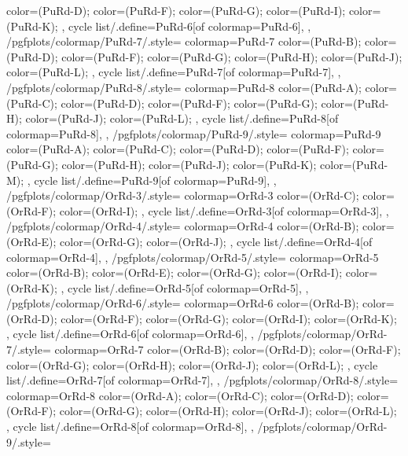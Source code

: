 {{{      color=(PuRd-D);
      color=(PuRd-F);
      color=(PuRd-G);
      color=(PuRd-I);
      color=(PuRd-K);
    },
    cycle list/.define={PuRd-6}{[of colormap=PuRd-6]},
  },
  /pgfplots/colormap/PuRd-7/.style={
    colormap={PuRd-7}{
      color=(PuRd-B);
      color=(PuRd-D);
      color=(PuRd-F);
      color=(PuRd-G);
      color=(PuRd-H);
      color=(PuRd-J);
      color=(PuRd-L);
    },
    cycle list/.define={PuRd-7}{[of colormap=PuRd-7]},
  },
  /pgfplots/colormap/PuRd-8/.style={
    colormap={PuRd-8}{
      color=(PuRd-A);
      color=(PuRd-C);
      color=(PuRd-D);
      color=(PuRd-F);
      color=(PuRd-G);
      color=(PuRd-H);
      color=(PuRd-J);
      color=(PuRd-L);
    },
    cycle list/.define={PuRd-8}{[of colormap=PuRd-8]},
  },
  /pgfplots/colormap/PuRd-9/.style={
    colormap={PuRd-9}{
      color=(PuRd-A);
      color=(PuRd-C);
      color=(PuRd-D);
      color=(PuRd-F);
      color=(PuRd-G);
      color=(PuRd-H);
      color=(PuRd-J);
      color=(PuRd-K);
      color=(PuRd-M);
    },
    cycle list/.define={PuRd-9}{[of colormap=PuRd-9]},
  },
  /pgfplots/colormap/OrRd-3/.style={
    colormap={OrRd-3}{
      color=(OrRd-C);
      color=(OrRd-F);
      color=(OrRd-I);
    },
    cycle list/.define={OrRd-3}{[of colormap=OrRd-3]},
  },
  /pgfplots/colormap/OrRd-4/.style={
    colormap={OrRd-4}{
      color=(OrRd-B);
      color=(OrRd-E);
      color=(OrRd-G);
      color=(OrRd-J);
    },
    cycle list/.define={OrRd-4}{[of colormap=OrRd-4]},
  },
  /pgfplots/colormap/OrRd-5/.style={
    colormap={OrRd-5}{
      color=(OrRd-B);
      color=(OrRd-E);
      color=(OrRd-G);
      color=(OrRd-I);
      color=(OrRd-K);
    },
    cycle list/.define={OrRd-5}{[of colormap=OrRd-5]},
  },
  /pgfplots/colormap/OrRd-6/.style={
    colormap={OrRd-6}{
      color=(OrRd-B);
      color=(OrRd-D);
      color=(OrRd-F);
      color=(OrRd-G);
      color=(OrRd-I);
      color=(OrRd-K);
    },
    cycle list/.define={OrRd-6}{[of colormap=OrRd-6]},
  },
  /pgfplots/colormap/OrRd-7/.style={
    colormap={OrRd-7}{
      color=(OrRd-B);
      color=(OrRd-D);
      color=(OrRd-F);
      color=(OrRd-G);
      color=(OrRd-H);
      color=(OrRd-J);
      color=(OrRd-L);
    },
    cycle list/.define={OrRd-7}{[of colormap=OrRd-7]},
  },
  /pgfplots/colormap/OrRd-8/.style={
    colormap={OrRd-8}{
      color=(OrRd-A);
      color=(OrRd-C);
      color=(OrRd-D);
      color=(OrRd-F);
      color=(OrRd-G);
      color=(OrRd-H);
      color=(OrRd-J);
      color=(OrRd-L);
    },
    cycle list/.define={OrRd-8}{[of colormap=OrRd-8]},
  },
  /pgfplots/colormap/OrRd-9/.style={
}}
